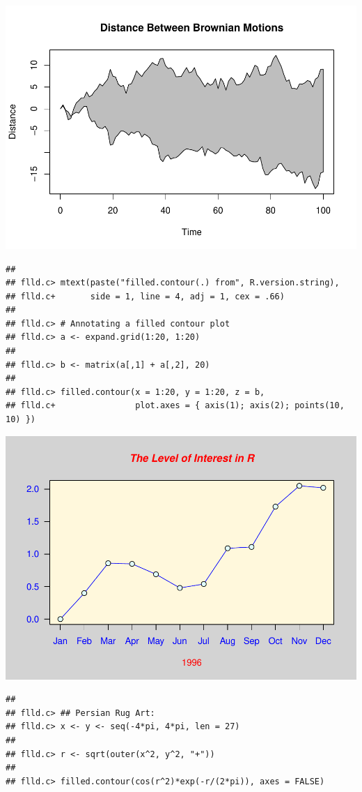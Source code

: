 \documentclass[
]{book}
\begin{document}
\includegraphics{TudodoR_files/figure-latex/unnamed-chunk-147-5.pdf}

\begin{verbatim}
## 
## flld.c> mtext(paste("filled.contour(.) from", R.version.string),
## flld.c+       side = 1, line = 4, adj = 1, cex = .66)
## 
## flld.c> # Annotating a filled contour plot
## flld.c> a <- expand.grid(1:20, 1:20)
## 
## flld.c> b <- matrix(a[,1] + a[,2], 20)
## 
## flld.c> filled.contour(x = 1:20, y = 1:20, z = b,
## flld.c+                plot.axes = { axis(1); axis(2); points(10, 10) })
\end{verbatim}

\includegraphics{TudodoR_files/figure-latex/unnamed-chunk-147-6.pdf}

\begin{verbatim}
## 
## flld.c> ## Persian Rug Art:
## flld.c> x <- y <- seq(-4*pi, 4*pi, len = 27)
## 
## flld.c> r <- sqrt(outer(x^2, y^2, "+"))
## 
## flld.c> filled.contour(cos(r^2)*exp(-r/(2*pi)), axes = FALSE)
\end{verbatim}
\end{document}
